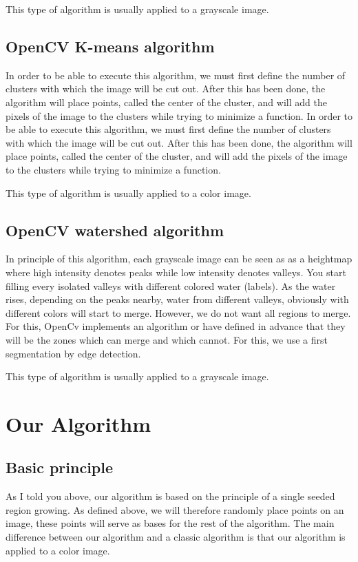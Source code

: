 \documentclass[conference]{IEEEtran}
\begin{document}
This type of algorithm is usually applied to a grayscale image.


\subsection{OpenCV K-means algorithm}

In order to be able to execute this algorithm, we must first define the number of clusters with which the image will be cut out. After this has been done, the algorithm will place points, called the center of the cluster, and will add the pixels of the image to the clusters while trying to minimize a function.
In order to be able to execute this algorithm, we must first define the number of clusters with which the image will be cut out. After this has been done, the algorithm will place points, called the center of the cluster, and will add the pixels of the image to the clusters while trying to minimize a function.

This type of algorithm is usually applied to a color image.

\subsection{OpenCV watershed algorithm}

In principle of this algorithm, each grayscale image can be seen as as a heightmap where high intensity denotes peaks while low intensity denotes valleys. You start filling every isolated valleys with different colored water (labels). As the water rises, depending on the peaks nearby, water from different valleys, obviously with different colors will start to merge.  However, we do not want all regions to merge.
For this, OpenCv implements an algorithm or have defined in advance that they will be the zones which can merge and which cannot. For this, we use a first segmentation by edge detection.

This type of algorithm is usually applied to a grayscale image.

\section{Our Algorithm}

\subsection{Basic principle}

As I told you above, our algorithm is based on the principle of a single seeded region growing. As defined above, we will therefore randomly place points on an image, these points will serve as bases for the rest of the algorithm. The main difference between our algorithm and a classic algorithm is that our algorithm is applied to a color image. 
\end{document}
